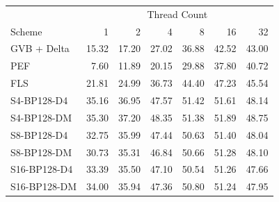 \begin{tabular}{lrrrrrr}
\toprule
 & \multicolumn{6}{c}{Thread Count} \\
Scheme & 1 & 2 & 4 & 8 & 16 & 32 \\
\midrule
GVB + Delta & 15.32 & 17.20 & 27.02 & 36.88 & 42.52 & 43.00 \\
PEF & 7.60 & 11.89 & 20.15 & 29.88 & 37.80 & 40.72 \\
FLS & 21.81 & 24.99 & 36.73 & 44.40 & 47.23 & 45.54 \\
S4-BP128-D4 & 35.16 & 36.95 & 47.57 & 51.42 & 51.61 & 48.14 \\
S4-BP128-DM & 35.30 & 37.20 & 48.35 & 51.38 & 51.89 & 48.75 \\
S8-BP128-D4 & 32.75 & 35.99 & 47.44 & 50.63 & 51.40 & 48.04 \\
S8-BP128-DM & 30.73 & 35.31 & 46.84 & 50.66 & 51.28 & 48.10 \\
S16-BP128-D4 & 33.39 & 35.50 & 47.10 & 50.54 & 51.26 & 47.66 \\
S16-BP128-DM & 34.00 & 35.94 & 47.36 & 50.80 & 51.24 & 47.95 \\
\bottomrule
\end{tabular}
